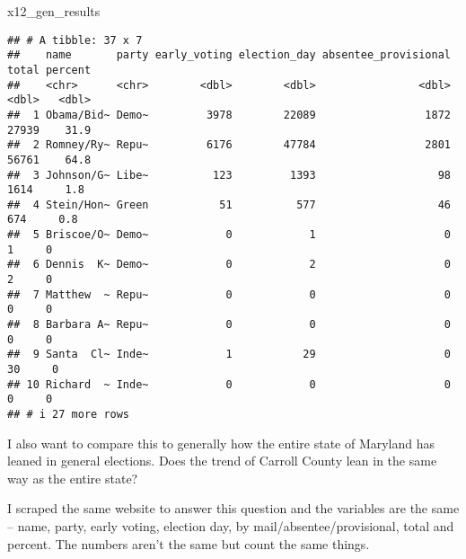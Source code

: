 \documentclass[
]{article}
\newenvironment{Shaded}{\begin{snugshade}}{\end{snugshade}}
\newcommand{\NormalTok}[1]{#1}
\begin{document}
\begin{Shaded}
\begin{Highlighting}[]
\NormalTok{x12\_gen\_results}
\end{Highlighting}
\end{Shaded}

\begin{verbatim}
## # A tibble: 37 x 7
##    name       party early_voting election_day absentee_provisional total percent
##    <chr>      <chr>        <dbl>        <dbl>                <dbl> <dbl>   <dbl>
##  1 Obama/Bid~ Demo~         3978        22089                 1872 27939    31.9
##  2 Romney/Ry~ Repu~         6176        47784                 2801 56761    64.8
##  3 Johnson/G~ Libe~          123         1393                   98  1614     1.8
##  4 Stein/Hon~ Green           51          577                   46   674     0.8
##  5 Briscoe/O~ Demo~            0            1                    0     1     0  
##  6 Dennis  K~ Demo~            0            2                    0     2     0  
##  7 Matthew  ~ Repu~            0            0                    0     0     0  
##  8 Barbara A~ Repu~            0            0                    0     0     0  
##  9 Santa  Cl~ Inde~            1           29                    0    30     0  
## 10 Richard  ~ Inde~            0            0                    0     0     0  
## # i 27 more rows
\end{verbatim}

I also want to compare this to generally how the entire state of
Maryland has leaned in general elections. Does the trend of Carroll
County lean in the same way as the entire state?

I scraped the same website to answer this question and the variables are
the same -- name, party, early voting, election day, by
mail/absentee/provisional, total and percent. The numbers aren't the
same but count the same things.
\end{document}
